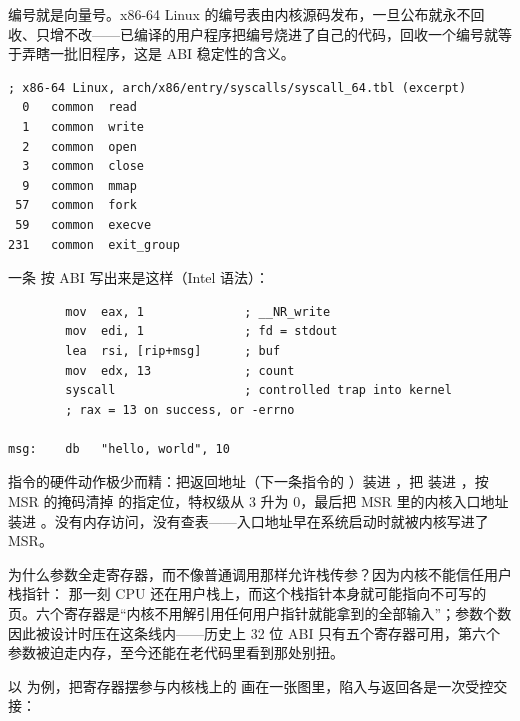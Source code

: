 编号就是向量号。x86-64 Linux 的编号表由内核源码发布，一旦公布就永不回收、只增不改——已编译的用户程序把编号烧进了自己的代码，回收一个编号就等于弄瞎一批旧程序，这是 ABI 稳定性的含义。

\begin{lstlisting}
; x86-64 Linux, arch/x86/entry/syscalls/syscall_64.tbl (excerpt)
  0   common  read
  1   common  write
  2   common  open
  3   common  close
  9   common  mmap
 57   common  fork
 59   common  execve
231   common  exit_group
\end{lstlisting}

一条  按 ABI 写出来是这样（Intel 语法）：

\begin{lstlisting}
        mov  eax, 1              ; __NR_write
        mov  edi, 1              ; fd = stdout
        lea  rsi, [rip+msg]      ; buf
        mov  edx, 13             ; count
        syscall                  ; controlled trap into kernel
        ; rax = 13 on success, or -errno

msg:    db   "hello, world", 10
\end{lstlisting}

 指令的硬件动作极少而精：把返回地址（下一条指令的 ）装进 ，把  装进 ，按  MSR 的掩码清掉  的指定位，特权级从 3 升为 0，最后把  MSR 里的内核入口地址装进 。没有内存访问，没有查表——入口地址早在系统启动时就被内核写进了 MSR。

为什么参数全走寄存器，而不像普通调用那样允许栈传参？因为内核不能信任用户栈指针： 那一刻 CPU 还在用户栈上，而这个栈指针本身就可能指向不可写的页。六个寄存器是“内核不用解引用任何用户指针就能拿到的全部输入”；参数个数因此被设计时压在这条线内——历史上 32 位 ABI 只有五个寄存器可用，第六个参数被迫走内存，至今还能在老代码里看到那处别扭。

以  为例，把寄存器摆参与内核栈上的  画在一张图里，陷入与返回各是一次受控交接：

